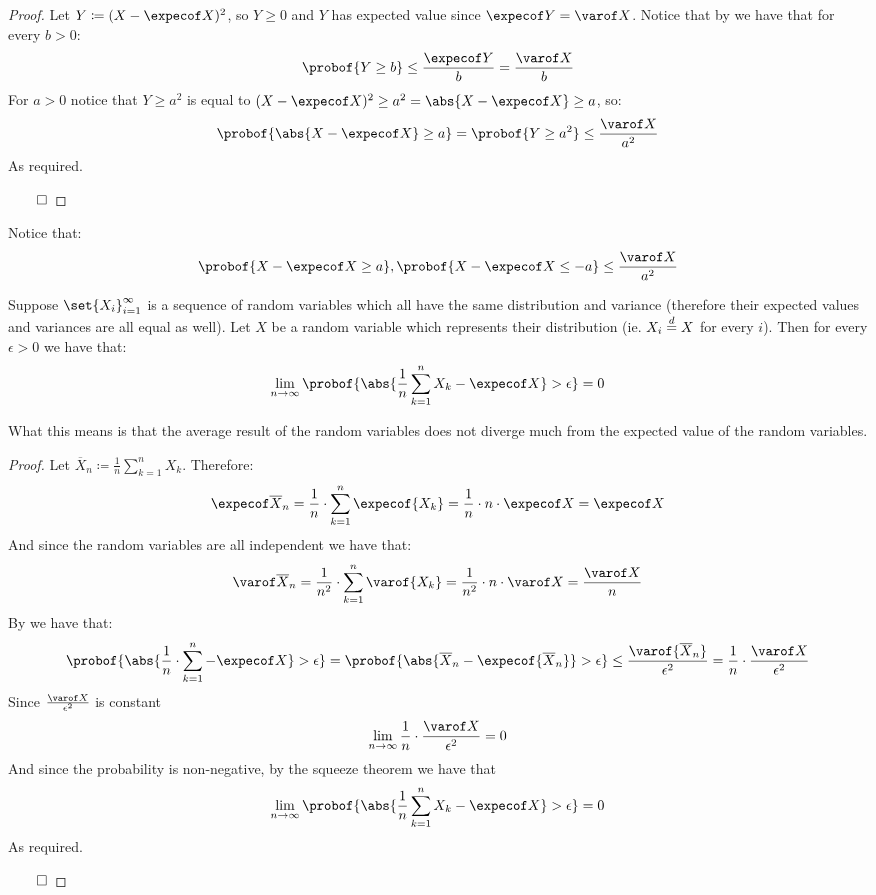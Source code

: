 \begin{proof}

	Let $Y\coloneqq(X-\expecof X)^2$, so $Y\geq0$ and $Y$ has expected value since $\expecof Y=\varof X$.
	Notice that by  we have that for every $b>0$:
	\[ \probof{Y\geq b} \leq \frac{\expecof Y}b = \frac{\varof X}b \]
	For $a>0$ notice that $Y\geq a^2$ is equal to $(X-\expecof X)^2\geq a^2=\abs{X-\expecof X}\geq a$, so:
	\[ \probof{\abs{X-\expecof X}\geq a} = \probof{Y\geq a^2} \leq \frac{\varof X}{a^2} \]
	As required.

	\hfill$\qed$

\end{proof}

Notice that:
\[ \probof{X-\expecof X\geq a}, \probof{X-\expecof X\leq -a} \leq \frac{\varof X}{a^2} \]

\begin{thrm*}

	Suppose $\set{X_i}_{i=1}^\infty$ is a sequence of random variables which all have the same distribution and variance
	(therefore their expected values and variances are all equal as well).
	Let $X$ be a random variable which represents their distribution (ie. $X_i\mathrel{\overset d=} X$ for every $i$).
	Then for every $\epsilon>0$ we have that:
    \[ \lim_{n\to\infty}\probof{\abs{\frac1n\sum_{k=1}^n X_k - \expecof X}>\epsilon} = 0 \]

\end{thrm*}

What this means is that the average result of the random variables does not diverge much from the expected value of
the random variables.

\begin{proof}

	\def\avgX{\overline X_n}
	Let $\avgX\coloneqq\frac1n\sum\limits_{k=1}^n X_k$.
	Therefore:
	\[ \expecof\avgX = \frac1n\cdot\sum_{k=1}^n\expecof{X_k} = \frac1n\cdot n\cdot\expecof X = \expecof X \]
	And since the random variables are all independent we have that:
	\[ \varof\avgX = \frac1{n^2}\cdot\sum_{k=1}^n\varof{X_k} = \frac1{n^2}\cdot n\cdot\varof X = \frac{\varof X}n \]
	By  we have that:
	\[ \probof{\abs{\frac1n\cdot\sum_{k=1}^n-\expecof X}>\epsilon} = \probof{\abs{\avgX - \expecof{\avgX}}>\epsilon}
	\leq \frac{\varof{\avgX}}{\epsilon^2} = \frac1n\cdot\frac{\varof X}{\epsilon^2} \]
	Since $\frac{\varof X}{\epsilon^2}$ is constant
	\[ \lim_{n\to\infty}\frac1n\cdot\frac{\varof X}{\epsilon^2} = 0 \]
	And since the probability is non-negative, by the squeeze theorem we have that
    \[ \lim_{n\to\infty}\probof{\abs{\frac1n\sum_{k=1}^n X_k - \expecof X}>\epsilon} = 0 \]
	As required.

	\hfill$\qed$

\end{proof}

